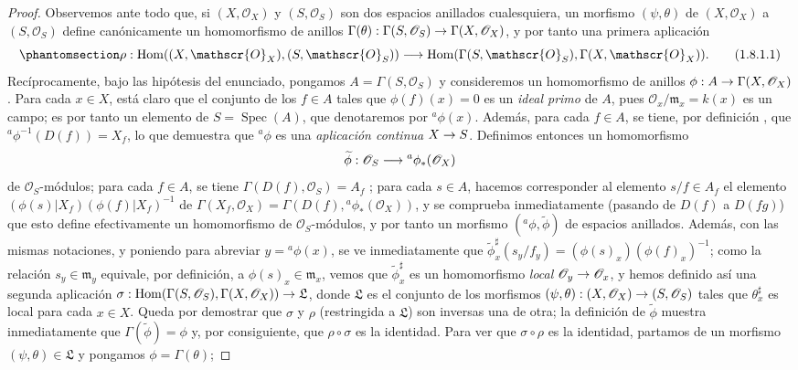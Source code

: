 \documentclass[oneside]{amsart}
\theoremstyle{ega-env-style}
\theoremstyle{ega-thm-env-style}
\theoremstyle{ega-defn-env-style}
\def\mathcal{\mathscr}
\def\sh{\mathcal}                   %
\def\vphi{\phi}                     %
\def\kres{k}                        %
\def\Hom{\operatorname{Hom}}
\def\Spec{\operatorname{Spec}}
\renewcommand{\to}{\mathchoice{\longrightarrow}{\rightarrow}{\rightarrow}{\rightarrow}}
\let\EGAOriginalLabel\label
\renewcommand{\label}[1]{\phantomsection\EGAOriginalLabel{#1}}
\begin{document}
\begin{proof}
Observemos ante todo que, si $(X,\sh{O}_X)$ y $(S,\sh{O}_S)$ son dos espacios anillados cualesquiera, un morfismo $(\psi,\theta)$ de $(X,\sh{O}_X)$ a $(S,\sh{O}_S)$ define canónicamente un homomorfismo de anillos $\Gamma(\theta):\Gamma(S,\sh{O}_S)\to\Gamma(X,\sh{O}_X)$, y por tanto una primera aplicación
\[
  \label{I.1.8.1.1}
  \rho:\Hom((X,\sh{O}_X),(S,\sh{O}_S))\to\Hom(\Gamma(S,\sh{O}_S),\Gamma(X,\sh{O}_X)).
  \tag{1.8.1.1}
\]
Recíprocamente, bajo las hipótesis del enunciado, pongamos $A=\Gamma(S,\sh{O}_S)$ y consideremos un homomorfismo de anillos $\vphi:A\to\Gamma(X,\sh{O}_X)$.
Para cada $x\in X$, está claro que el conjunto de los $f\in A$ tales que $\vphi(f)(x)=0$ es un \emph{ideal primo} de $A$, pues $\sh{O}_x/\mathfrak{m}_x=\kres(x)$ es un campo;
es por tanto un elemento de $S=\Spec(A)$, que denotaremos por ${}^a\vphi(x)$.
  Además, para cada $f\in A$, se tiene, por definición , que ${}^a\vphi^{-1}(D(f))=X_f$, lo que demuestra que ${}^a\vphi$ es una \emph{aplicación continua} $X\to S$.
Definimos entonces un homomorfismo
\[
  \widetilde{\vphi}:\sh{O}_S\to{}^a\vphi_*(\sh{O}_X)
\]
de $\sh{O}_S$-módulos;
para cada $f\in A$, se tiene $\Gamma(D(f),\sh{O}_S)=A_f$ ;
para cada $s\in A$, hacemos corresponder al elemento $s/f\in A_f$ el elemento $(\vphi(s)|X_f)(\vphi(f)|X_f)^{-1}$ de $\Gamma(X_f,\sh{O}_X)=\Gamma(D(f),{}^a\vphi_*(\sh{O}_X))$, y se comprueba inmediatamente (pasando de $D(f)$ a $D(fg)$) que esto define efectivamente un homomorfismo de $\sh{O}_S$-módulos, y por tanto un morfismo $({}^a\vphi,\widetilde{\vphi})$ de espacios anillados.
Además, con las mismas notaciones, y poniendo para abreviar $y={}^a\vphi(x)$, se ve inmediatamente  que $\widetilde{\vphi}_x^\sharp(s_y/f_y)=(\vphi(s)_x)(\vphi(f)_x)^{-1}$;
como la relación $s_y\in\mathfrak{m}_y$ equivale, por definición, a $\vphi(s)_x\in\mathfrak{m}_x$, vemos que $\widetilde{\vphi}_x^\sharp$ es un homomorfismo \emph{local} $\sh{O}_y\to\sh{O}_x$, y hemos definido así una segunda aplicación $\sigma:\Hom(\Gamma(S,\sh{O}_S),\Gamma(X,\sh{O}_X))\to\mathfrak{L}$, donde $\mathfrak{L}$ es el conjunto de los morfismos $(\psi,\theta):(X,\sh{O}_X)\to(S,\sh{O}_S)$ tales que $\theta_x^\sharp$ es local para cada $x\in X$.
Queda por demostrar que $\sigma$ y $\rho$ (restringida a $\mathfrak{L}$) son inversas una de otra;
la definición de $\widetilde{\vphi}$ muestra inmediatamente que $\Gamma(\widetilde{\vphi})=\vphi$ y, por consiguiente, que $\rho\circ\sigma$ es la identidad.
Para ver que $\sigma\circ\rho$ es la identidad, partamos de un morfismo $(\psi,\theta)\in\mathfrak{L}$ y pongamos $\vphi=\Gamma(\theta)$;

\end{proof}
\end{document}
